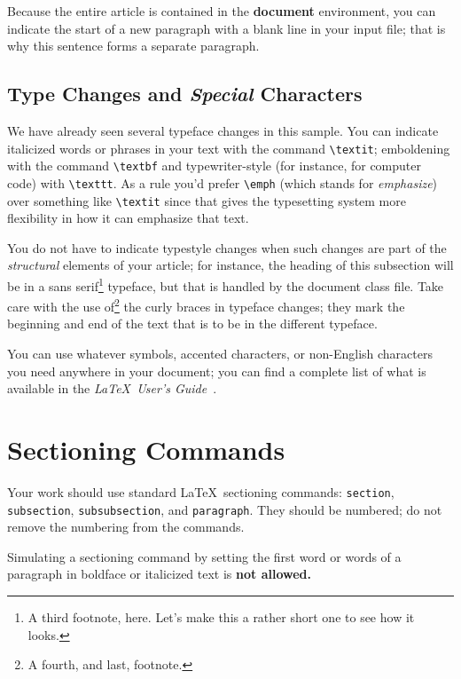 \documentclass[sigplan,screen,nonacm]{acmart}
\begin{document}
Because the entire article is contained in
the \textbf{document} environment, you can indicate the
start of a new paragraph with a blank line in your
input file; that is why this sentence forms a separate paragraph.

\subsection{Type Changes and \textit{Special} Characters}
\label{sec:typeChangesSpecialChars}

We have already seen several typeface changes in this sample.  You
can indicate italicized words or phrases in your text with
the command \texttt{\textbackslash textit}; emboldening with the
command \texttt{\textbackslash textbf}
and typewriter-style (for instance, for computer code) with
\texttt{\textbackslash texttt}.
As a rule you'd prefer \texttt{\textbackslash emph} (which stands for \emph{emphasize})
over something like \texttt{\textbackslash textit} since that gives the typesetting system
more flexibility in how it can emphasize that text.

You do not
have to indicate typestyle changes when such changes are
part of the \textit{structural} elements of your
article; for instance, the heading of this subsection will
be in a sans serif\footnote{A third footnote, here.
Let's make this a rather short one to
see how it looks.} typeface, but that is handled by the
document class file. Take care with the use
of\footnote{A fourth, and last, footnote.}
the curly braces in typeface changes; they mark
the beginning and end of
the text that is to be in the different typeface.

You can use whatever symbols, accented characters, or
non-English characters you need anywhere in your document;
you can find a complete list of what is
available in the \textit{\LaTeX\
User's Guide}~\cite{Lamport:LaTeX}.


\section{Sectioning Commands}

Your work should use standard \LaTeX\ sectioning commands:
\verb|section|, \verb|subsection|, \verb|subsubsection|, and
\verb|paragraph|. They should be numbered; do not remove the numbering
from the commands.

Simulating a sectioning command by setting the first word or words of
a paragraph in boldface or italicized text is {\bfseries not allowed.}
\end{document}

